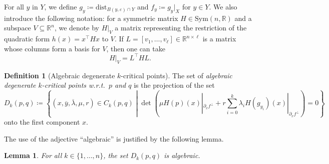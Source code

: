 \documentclass{amsart}
\newcommand{\R}{\mathbb{R}}
\newtheorem{lemma}[subsubsection]{Lemma}
\theoremstyle{definition}
\newtheorem{definition}[subsubsection]{Definition}
\theoremstyle{remark}
\begin{document}
For all $y$ in $Y$, we define $g_y \coloneqq \text{dist}_{B(y, \varepsilon) \cap Y}$ and $f_y \coloneqq g_y |_X$ for $y \in Y$.
We also introduce the following notation: for a symmetric matrix $H\in \mathrm{Sym}(n, \R)$ and a subspace $V\subseteq \R^n$, we denote by 
$H|_V$ a matrix representing the restriction of the quadratic form $h(x)=x^\top Hx$ to $V$. If $L=[v_1, \ldots, v_\ell]\in \R^{n\times \ell}$ is a matrix whose columns form a basis for $V$, then one can take
$$H|_{V}=L^\top HL.$$

\begin{definition}[Algebraic degenerate $k$-critical points]
The set of \emph{algebraic degenerate $k$-critical points w.r.t.\ $p$ and $q$} is the projection of the set
\begin{equation}
\label{E:alg-degenerate}
D_k(p, q) \coloneqq \left\{
(x, \overline{y}, \overline{\lambda}, \mu, r) \in C_k(p, q)
\; \left| \;
\det \left(\mu H(p)(x)|_{\partial_x f^\bot} + r \sum_{i = 0}^k \lambda_i H(g_{y_i})(x)|_{\partial_x f^\bot} \right) = 0
\right.
\right\}
\end{equation}
onto the first component $x$.
\end{definition}

The use of the adjective ``algebraic'' is justified by the following lemma.

\begin{lemma}
\label{L:alg-deg-is-alg}
For all $k \in \{1, \ldots, n\}$, the set $D_k(p, q)$ is algebraic.
\end{lemma}
\end{document}
